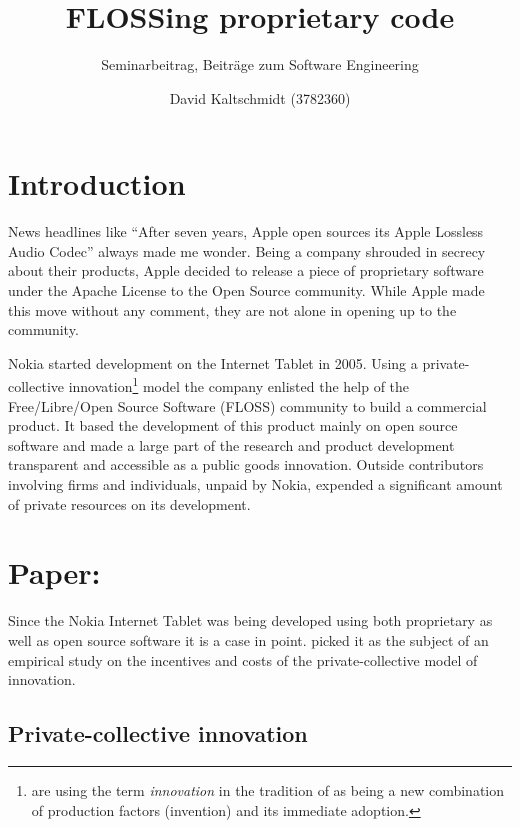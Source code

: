 \documentclass[a4paper]{scrartcl}
\title{FLOSSing proprietary code}
\subtitle{Seminarbeitrag, Beiträge zum Software Engineering}
\author{David Kaltschmidt (3782360)}
\newcommand{\todo}[1]{{\it \color{gray} #1}}
\begin{document}
\maketitle

\section{Introduction}

News headlines like ``After seven years, Apple open sources its Apple Lossless Audio Codec''\cite{ars201110alac} always made me wonder.
Being a company shrouded in secrecy about their products, Apple decided to release a piece of proprietary software under the Apache License to the Open Source community. 
While Apple made this move without any comment, they are not alone in opening up to the community.

Nokia started development on the Internet Tablet in 2005. 
Using a private-collective innovation\footnote{\citeauthor{stuermer2009extending} are using the term \emph{innovation} in the tradition of \textcite[Ch 3.B, p. 83]{schumpeter1939business} as being a new combination of production factors (invention) and its immediate adoption.} model the company enlisted the help of the Free/Libre/Open Source Software (FLOSS) community to build a commercial product. 
It based the development of this product mainly on open source software and made a large part of the research and product development transparent and accessible as a public goods innovation.
Outside contributors involving firms and individuals, unpaid by Nokia, expended a significant
amount of private resources on its development.

\section{Paper: }

\todo{}

Since the Nokia Internet Tablet was being developed using both proprietary as well as open source software it is a case in point. 
\citeauthor{stuermer2009extending} picked it as the subject of an empirical study on the incentives and costs of the private-collective model of innovation.

\subsection{Private-collective innovation}
\end{document}
